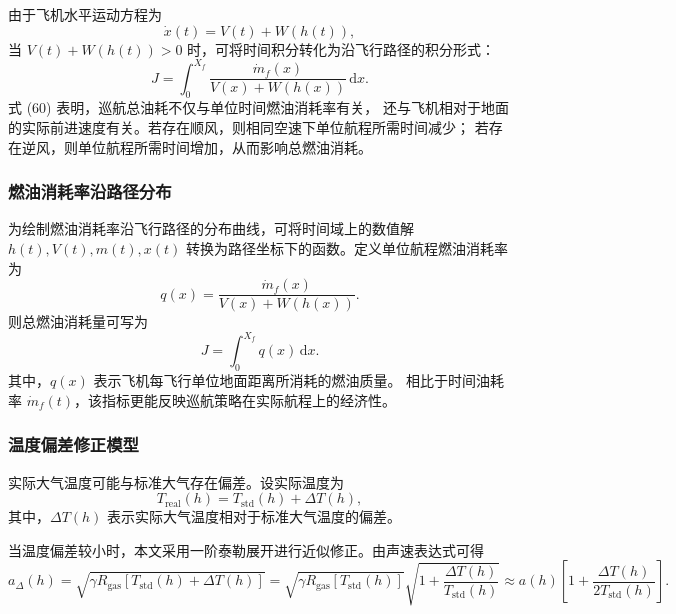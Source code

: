 \documentclass[UTF8]{ctexart}
\begin{document}
由于飞机水平运动方程为
\begin{equation}
    \dot x(t)=V(t)+W(h(t)),
    \label{eq:q2_xdot}
\end{equation}
当 $V(t)+W(h(t))>0$ 时，可将时间积分转化为沿飞行路径的积分形式：
\begin{equation}
    J
    =
    \int_{0}^{X_f}
    \frac{\dot m_f(x)}{V(x)+W(h(x))}\,\mathrm{d}x.
    \label{eq:q2_total_fuel_path}
\end{equation}
式 (60) 表明，巡航总油耗不仅与单位时间燃油消耗率有关，
还与飞机相对于地面的实际前进速度有关。若存在顺风，则相同空速下单位航程所需时间减少；
若存在逆风，则单位航程所需时间增加，从而影响总燃油消耗。
\subsubsection{燃油消耗率沿路径分布}

为绘制燃油消耗率沿飞行路径的分布曲线，可将时间域上的数值解
$h(t),V(t),m(t),x(t)$ 转换为路径坐标下的函数。定义单位航程燃油消耗率为
\begin{equation}
    q(x)
    =
    \frac{\dot m_f(x)}{V(x)+W(h(x))}.
    \label{eq:q2_fuel_per_distance}
\end{equation}
则总燃油消耗量可写为
\begin{equation}
    J=\int_{0}^{X_f}q(x)\,\mathrm{d}x.
    \label{eq:q2_total_q}
\end{equation}
其中，$q(x)$ 表示飞机每飞行单位地面距离所消耗的燃油质量。
相比于时间油耗率 $\dot m_f(t)$，该指标更能反映巡航策略在实际航程上的经济性。

\subsubsection{温度偏差修正模型}

实际大气温度可能与标准大气存在偏差。设实际温度为
\begin{equation}
    T_{\mathrm{real}}(h)
    =
    T_{\mathrm{std}}(h)+\Delta T(h),
    \label{eq:q2_T_real}
\end{equation}
其中，$\Delta T(h)$ 表示实际大气温度相对于标准大气温度的偏差。

当温度偏差较小时，本文采用一阶泰勒展开进行近似修正。由声速表达式可得
\begin{equation}
    a_{\Delta}(h)
    =
    \sqrt{\gamma R_{\mathrm{gas}}\left[T_{\mathrm{std}}(h)+\Delta T(h)\right]}
    =
    \sqrt{\gamma R_{\mathrm{gas}}\left[T_{\mathrm{std}}(h)\right]}\sqrt{1+\frac{\Delta T(h)}{T_{\mathrm{std}}(h)}}
    \approx
    a(h)
    \left[
    1+\frac{\Delta T(h)}{2T_{\mathrm{std}}(h)}
    \right].
    \label{eq:q2_a_delta}
\end{equation}
\end{document}
